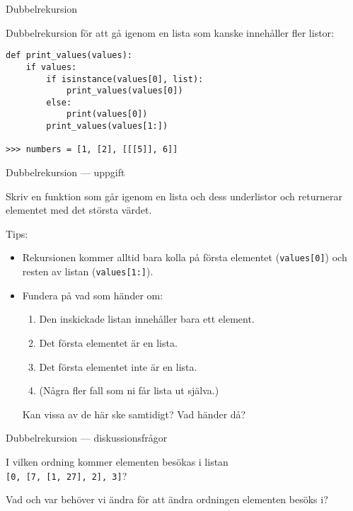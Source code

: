 \documentclass{beamer}
\begin{document}
  \begin{frame}[fragile]{Dubbelrekursion}

    Dubbelrekursion för att gå igenom en lista som kanske innehåller fler listor:

    \begin{verbatim}
def print_values(values):
    if values:
        if isinstance(values[0], list):
            print_values(values[0])
        else:
            print(values[0])
        print_values(values[1:])

>>> numbers = [1, [2], [[[5]], 6]]

    \end{verbatim}

  \end{frame}
  \begin{frame}[fragile]{Dubbelrekursion --- uppgift}

    Skriv en funktion som går igenom en lista och dess underlistor och
    returnerar elementet med det största värdet.

    Tips:

    \vspace{-1em}

    \begin{itemize}

      \item Rekursionen kommer alltid bara kolla på första elementet
      (\texttt{values[0]}) och resten av listan (\texttt{values[1:]}).

      \item Fundera på vad som händer om:

      \begin{enumerate}
        \item Den inskickade listan innehåller bara ett element.
        \item Det första elementet är en lista.
        \item Det första elementet inte är en lista.
        \item (Några fler fall som ni får lista ut själva.)
      \end{enumerate}

      Kan vissa av de här ske samtidigt? Vad händer då?

    \end{itemize}

  \end{frame}

  \begin{frame}{Dubbelrekursion --- diskussionsfrågor}

    I vilken ordning kommer elementen besökas i listan \\ \texttt{[0, [7, [1, 27], 2], 3]}?

    Vad och var behöver vi ändra för att ändra ordningen elementen besöks i?

  \end{frame}
\end{document}
